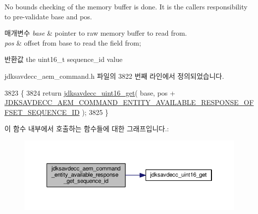 No bounds checking of the memory buffer is done. It is the caller\textquotesingle{}s responsibility to pre-\/validate base and pos.


\begin{DoxyParams}{매개변수}
{\em base} & pointer to raw memory buffer to read from. \\
\hline
{\em pos} & offset from base to read the field from; \\
\hline
\end{DoxyParams}
\begin{DoxyReturn}{반환값}
the uint16\+\_\+t sequence\+\_\+id value 
\end{DoxyReturn}


jdksavdecc\+\_\+aem\+\_\+command.\+h 파일의 3822 번째 라인에서 정의되었습니다.


\begin{DoxyCode}
3823 \{
3824     \textcolor{keywordflow}{return} \hyperlink{group__endian_ga3fbbbc20be954aa61e039872965b0dc9}{jdksavdecc\_uint16\_get}( base, pos + 
      \hyperlink{group__command__entity__available__response_ga58797652b29de1dd66cca10f4ac77178}{JDKSAVDECC\_AEM\_COMMAND\_ENTITY\_AVAILABLE\_RESPONSE\_OFFSET\_SEQUENCE\_ID}
       );
3825 \}
\end{DoxyCode}


이 함수 내부에서 호출하는 함수들에 대한 그래프입니다.\+:
\nopagebreak
\begin{figure}[H]
\begin{center}
\leavevmode
\includegraphics[width=350pt]{group__command__entity__available__response_ga023e8f97c780f3fa3fb840803697c07a_cgraph}
\end{center}
\end{figure}


